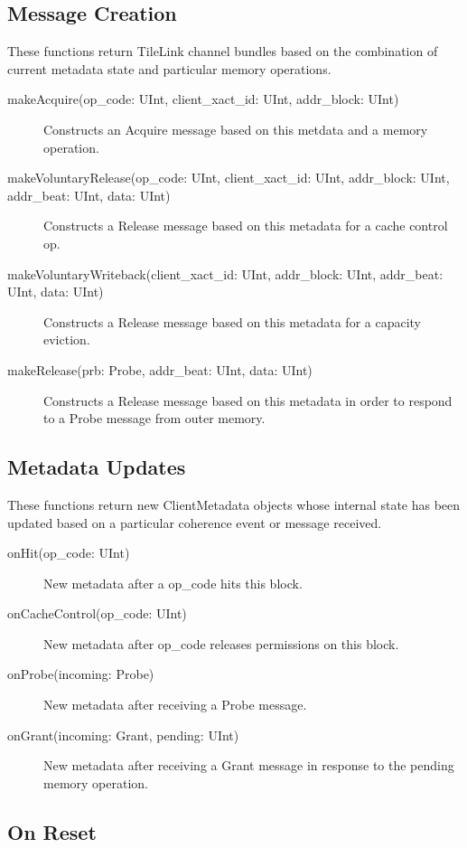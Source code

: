 \subsection{Message Creation}

These functions return TileLink channel bundles based on the combination of current metadata state and particular memory operations.

\begin{description}
\item[makeAcquire(op\_code: UInt, client\_xact\_id: UInt, addr\_block: UInt) ]
Constructs an Acquire message based on this metdata and a memory operation.
\item[makeVoluntaryRelease(op\_code: UInt, client\_xact\_id: UInt, addr\_block: UInt, addr\_beat: UInt, data: UInt) ]
Constructs a Release message based on this metadata for a cache control op.
\item[makeVoluntaryWriteback(client\_xact\_id: UInt, addr\_block: UInt, addr\_beat: UInt, data: UInt) ]
Constructs a Release message based on this metadata for a capacity eviction.
\item[makeRelease(prb: Probe, addr\_beat: UInt, data: UInt) ]
Constructs a Release message based on this metadata in order to respond to a Probe message from outer memory.
\end{description}

\subsection{Metadata Updates}

These functions return new ClientMetadata objects whose internal state has been updated based on a particular coherence event or message received.

\begin{description}
\item[onHit(op\_code: UInt) ]
New metadata after a op\_code hits this block.
\item[onCacheControl(op\_code: UInt) ]
New metadata after op\_code releases permissions on this block.
\item[onProbe(incoming: Probe) ]
New metadata after receiving a Probe message.
\item[onGrant(incoming: Grant, pending: UInt) ]
New metadata after receiving a Grant message in response to the pending memory operation.
\end{description}

\subsection{On Reset}

